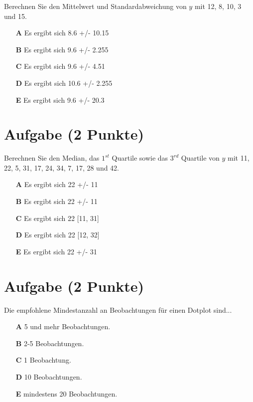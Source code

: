 \documentclass[a4paper, 9pt]{scrartcl}\usepackage[]{graphicx}\usepackage[]{xcolor}
\begin{document}
Berechnen Sie den Mittelwert und Standardabweichung von $y$ mit 12, 8, 10, 3 und 15.



\begin{enumerate}
\item [\textbf{A} \msquare] Es ergibt sich 8.6 +/- 10.15
\item [\textbf{B} \msquare] Es ergibt sich 9.6 +/- 2.255
\item [\textbf{C} \msquare] Es ergibt sich 9.6 +/- 4.51
\item [\textbf{D} \msquare] Es ergibt sich 10.6 +/- 2.255
\item [\textbf{E} \msquare] Es ergibt sich 9.6 +/- 20.3
\end{enumerate} 

\section{Aufgabe \hfill (2 Punkte)}




Berechnen Sie den Median, das $1^{st}$ Quartile sowie das $3^{rd}$ Quartile von $y$ mit 11, 22, 5, 31, 17, 24, 34, 7, 17, 28 und 42.



\begin{enumerate}
\item [\textbf{A} \msquare] Es ergibt sich 22 +/- 11
\item [\textbf{B} \msquare] Es ergibt sich 22 +/- 11
\item [\textbf{C} \msquare] Es ergibt sich 22 [11, 31]
\item [\textbf{D} \msquare] Es ergibt sich 22 [12, 32]
\item [\textbf{E} \msquare] Es ergibt sich 22 +/- 31
\end{enumerate} 

\section{Aufgabe \hfill (2 Punkte)}



Die empfohlene Mindestanzahl an Beobachtungen f{\"u}r einen Dotplot sind...



\begin{enumerate}
\item [\textbf{A} \msquare] 5 und mehr Beobachtungen.
\item [\textbf{B} \msquare] 2-5 Beobachtungen.
\item [\textbf{C} \msquare] 1 Beobachtung.
\item [\textbf{D} \msquare] 10 Beobachtungen.
\item [\textbf{E} \msquare] mindestens 20 Beobachtungen.
\end{enumerate}
\end{document}
